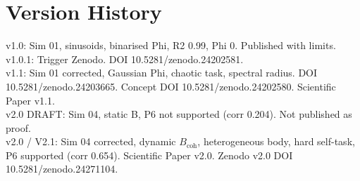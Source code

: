 \documentclass[11pt,a4paper]{article}
\begin{document}
\section{Version History}
v1.0: Sim 01, sinusoids, binarised Phi, R2 0.99, Phi 0. Published with limits.\\
v1.0.1: Trigger Zenodo. DOI 10.5281/zenodo.24202581.\\
v1.1: Sim 01 corrected, Gaussian Phi, chaotic task, spectral radius. DOI 10.5281/zenodo.24203665. Concept DOI 10.5281/zenodo.24202580. Scientific Paper v1.1.\\
v2.0 DRAFT: Sim 04, static B, P6 not supported (corr 0.204). Not published as proof.\\
v2.0 / V2.1: Sim 04 corrected, dynamic $B_{\text{coh}}$, heterogeneous body, hard self-task, P6 supported (corr 0.654). Scientific Paper v2.0. Zenodo v2.0 DOI 10.5281/zenodo.24271104.
\end{document}
